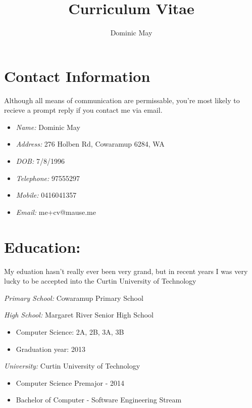 \documentclass{article}
\begin{document}
\title{Curriculum Vitae}
\author{Dominic May}

\maketitle
\tableofcontents
\newpage

\section{Contact Information}
  Although all means of communication are permissable, you're most likely to
  recieve a prompt reply if you contact me via email.
  \begin{itemize}
    \item{\emph{Name:} Dominic May}

    \item{\emph{Address:} 276 Holben Rd, Cowaramup 6284, WA}

    \item{\emph{DOB:} 7/8/1996}

    \item{\emph{Telephone:} 97555297}

    \item{\emph{Mobile:} 0416041357}

    \item{\emph{Email:} me+cv@mause.me}
  \end{itemize}

\section{Education:}
  My eduation hasn't really ever been very grand, but in recent years I was
  very lucky to be accepted into the Curtin University of Technology

  \emph{Primary School:} Cowaramup Primary School

  \emph{High School:} Margaret River Senior High School
  \begin{itemize}
    \item{Computer Science: 2A, 2B, 3A, 3B}
    \item{Graduation year: 2013}
  \end{itemize}

  \emph{University:} Curtin University of Technology
  \begin{itemize}
    \item{Computer Science Premajor - 2014}
    \item{Bachelor of Computer - Software Engineering Stream}
  \end{itemize}
\end{document}
